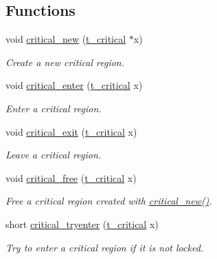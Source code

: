 \subsection*{Functions}
\begin{DoxyCompactItemize}
\item 
void \hyperlink{group__critical_gaaa373bcd9c8059e4887225aaf32a76d2}{critical\_\-new} (\hyperlink{group__critical_gaa00494020fc3fa3005b63a294cab3886}{t\_\-critical} $\ast$x)
\begin{DoxyCompactList}\small\item\em Create a new critical region. \item\end{DoxyCompactList}\item 
void \hyperlink{group__critical_ga246445cffc822f756ac6fb34a055022d}{critical\_\-enter} (\hyperlink{group__critical_gaa00494020fc3fa3005b63a294cab3886}{t\_\-critical} x)
\begin{DoxyCompactList}\small\item\em Enter a critical region. \item\end{DoxyCompactList}\item 
void \hyperlink{group__critical_ga269f46fef96f91143fc1616a4105984c}{critical\_\-exit} (\hyperlink{group__critical_gaa00494020fc3fa3005b63a294cab3886}{t\_\-critical} x)
\begin{DoxyCompactList}\small\item\em Leave a critical region. \item\end{DoxyCompactList}\item 
void \hyperlink{group__critical_gaedbe0cba11940710c789ac01194e3712}{critical\_\-free} (\hyperlink{group__critical_gaa00494020fc3fa3005b63a294cab3886}{t\_\-critical} x)
\begin{DoxyCompactList}\small\item\em Free a critical region created with \hyperlink{group__critical_gaaa373bcd9c8059e4887225aaf32a76d2}{critical\_\-new()}. \item\end{DoxyCompactList}\item 
short \hyperlink{group__critical_ga0a4109d5c2b82f0c1022015abac175dc}{critical\_\-tryenter} (\hyperlink{group__critical_gaa00494020fc3fa3005b63a294cab3886}{t\_\-critical} x)
\begin{DoxyCompactList}\small\item\em Try to enter a critical region if it is not locked. \item\end{DoxyCompactList}\end{DoxyCompactItemize}


